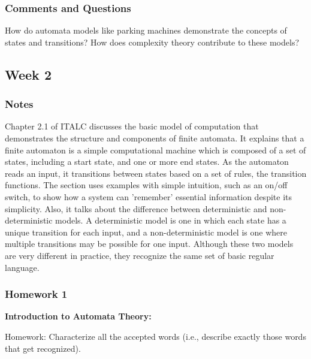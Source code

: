 \documentclass{article}
\theoremstyle{theorem}
\theoremstyle{definition}
\theoremstyle{remark}
\begin{document}



\subsubsection*{Comments and Questions}

How do automata models like parking machines demonstrate the concepts of states and transitions? How does complexity theory contribute to these models?

\subsection{Week 2}

\subsubsection*{Notes}

Chapter 2.1 of ITALC discusses the basic model of computation that demonstrates the structure and components of finite automata. It explains that a finite automaton is a simple computational machine which is composed of a set of states, including a start state, and one or more end states. As the automaton reads an input, it transitions between states based on a set of rules, the transition functions. The section uses examples with simple intuition, such as an on/off switch, to show how a system can 'remember' essential information despite its simplicity. Also, it talks about the difference between deterministic and non-deterministic models. A deterministic model is one in which each state has a unique transition for each input, and a non-deterministic model is one where multiple transitions may be possible for one input. Although these two models are very different in practice, they recognize the same set of basic regular language. 

\subsubsection*{Homework 1}

\textbf{Introduction to Automata Theory:}

Homework: Characterize all the accepted words (i.e., describe exactly those words that get recognized).
\end{document}
